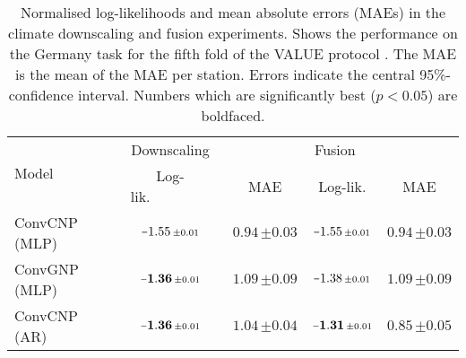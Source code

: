 \documentclass[12pt, twoside]{report}
\begin{document}
\begin{table}[t]
    \centering
    \caption[
        Results for the climate downscaling and fusion experiments
    ]{
        Normalised log-likelihoods and mean absolute errors (MAEs) in the climate downscaling and fusion experiments.
        Shows the performance on the Germany task for the fifth fold of the VALUE protocol \parencite{Maraun:2015:VALUE_A_Framework_to_Validate}.
        The MAE is the mean of the MAE per station.
        Errors indicate the central 95\%-confidence interval.
        Numbers which are significantly best ($p < 0.05$) are boldfaced.
    }
    \label{tab:climate_fusion_results}
    \small
    \begin{tabular}{lcccc}
        \toprule
        \multirow{2}{*}{Model} & Downscaling & & Fusion~~ &  \\
                               & Log-lik.~~~~~~~~$\,$ & MAE & Log-lik. & MAE  \\
        \midrule
        ConvCNP (MLP)
            & $\shortminus 1.55 \, {\scriptstyle \pm 0.01}$
            & $\mathbf{0.94} \, {\scriptstyle \pm 0.03}$
            & $\shortminus 1.55 \, {\scriptstyle \pm 0.01}$ 
            & $0.94 \, {\scriptstyle \pm 0.03}$ \\
        ConvGNP (MLP)
            & $\mathbf{\shortminus 1.36} \, {\scriptstyle \pm 0.01}$
            & $1.09 \, {\scriptstyle \pm 0.09}$
            & $\shortminus 1.38 \, {\scriptstyle \pm 0.01}$
            & $1.09 \, {\scriptstyle \pm 0.09}$ \\
        ConvCNP (AR)
            & $\mathbf{\shortminus 1.36} \, {\scriptstyle \pm 0.01}$
            & $1.04 \, {\scriptstyle \pm 0.04}$
            & $\mathbf{\shortminus 1.31} \, {\scriptstyle \pm 0.01}$
            & $\mathbf{0.85} \, {\scriptstyle \pm 0.05}$ \\
        \bottomrule
    \end{tabular}
\end{table}
\end{document}
